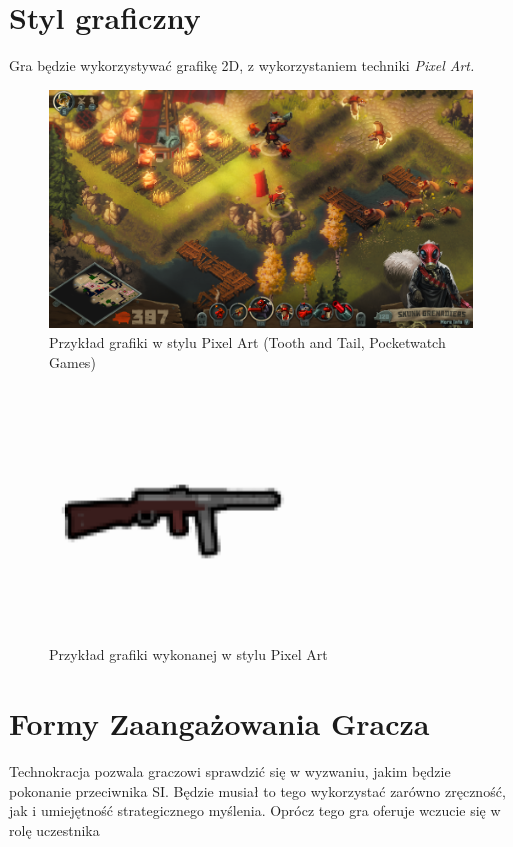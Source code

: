\documentclass[a4paper]{scrreprt}
\def \GameTiTle{Technokracja}
\begin{document}
\section{Styl graficzny}
Gra będzie wykorzystywać grafikę 2D, z wykorzystaniem techniki \emph{Pixel Art.}

\begin{figure}[hb]
\centering
\includegraphics[width=1\textwidth]{ToothAndTail.png}
\caption{\label{fig:arteg1} Przykład grafiki w stylu Pixel Art (Tooth and Tail, Pocketwatch Games)}
\end{figure}

\begin{figure}[hb]
  \centering
  \includegraphics[width=0.6\textwidth]{morswpng.png}
  \caption{\label{fig:arteg2} Przykład grafiki wykonanej w stylu Pixel Art}
  \end{figure}


\section{Formy Zaangażowania Gracza}
\GameTiTle{} pozwala graczowi sprawdzić się w wyzwaniu, jakim będzie pokonanie przeciwnika SI. Będzie musiał to tego wykorzystać zarówno zręczność, jak i umiejętność strategicznego myślenia. Oprócz tego gra oferuje wczucie się w rolę uczestnika 
\end{document}
